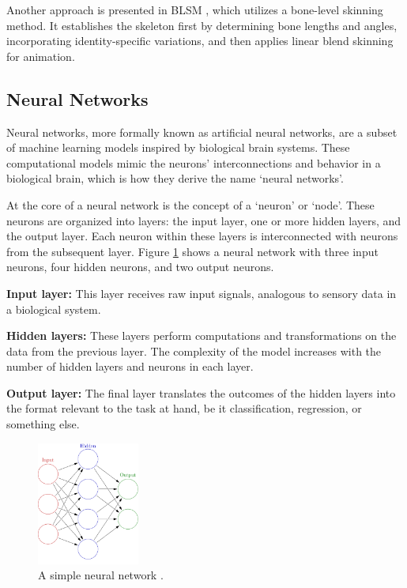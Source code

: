 Another approach is presented in BLSM \cite{doi:10.1007/978-3-030-58558-7_1},
which utilizes a bone-level skinning method. It establishes the skeleton first
by determining bone lengths and angles, incorporating identity-specific
variations, and then applies linear blend skinning for animation.

\subsection{Neural Networks}

Neural networks, more formally known as artificial neural networks, are a
subset of machine learning models inspired by biological brain systems. These
computational models mimic the neurons' interconnections and behavior in a
biological brain, which is how they derive the name `neural networks'.

At the core of a neural network is the concept of a `neuron' or `node'. These
neurons are organized into layers: the input layer, one or more hidden layers,
and the output layer. Each neuron within these layers is interconnected with
neurons from the subsequent layer. Figure \ref{fig:nn} shows a neural network
with three input neurons, four hidden neurons, and two output neurons.

\textbf{Input layer:} This layer receives raw input signals,
analogous to sensory data in a biological system.

\textbf{Hidden layers:} These layers perform computations and transformations
on the data from the previous layer. The complexity of the model increases with
the number of hidden layers and neurons in each layer.

\textbf{Output layer:} The final layer translates the outcomes of the hidden
layers into the format relevant to the task at hand, be it classification,
regression, or something else.

\begin{figure}
	\centering
	\includegraphics[width=0.3\textwidth]{files/nn.png}
	\caption{A simple neural network \cite{glosserca}.}
	\label{fig:nn}
\end{figure}

